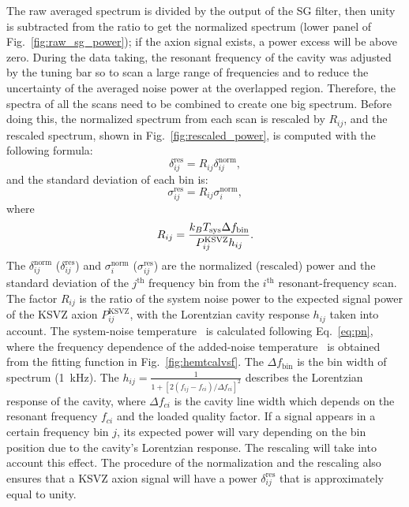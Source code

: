 The raw averaged spectrum is divided by the output of the SG filter, then  
unity is subtracted from the ratio to get the normalized spectrum 
 (lower panel of Fig.~\ref{fig:raw_sg_power}); 
if the axion signal exists, a power excess will be above zero.
During the data taking, the resonant frequency of the cavity was  
adjusted by the tuning bar so to scan a large range of frequencies and to 
reduce the uncertainty of the averaged noise power at the overlapped region. 
Therefore, the 
spectra of all the scans need to be combined to create one big spectrum. 
Before doing this, 
the normalized spectrum from each scan is rescaled by $R_{ij}$, 
and the rescaled spectrum, shown in 
Fig.~\ref{fig:rescaled_power}, is computed with the following formula:
\begin{equation}
  \label{eq:respower_eqn}
  \delta_{ij}^\text{res} = R_{ij}\delta_{ij}^\text{norm},
\end{equation}
and the standard deviation of each bin is:
\begin{equation}
  \label{eq:ressigma_eqn}
  \sigma_{ij}^\text{res} = R_{ij}\sigma_{i}^\text{norm},
\end{equation}
where 
 \begin{equation}
 R_{ij} = \frac{k_{B}T_\text{sys} \Delta f_\text{bin} }{P_{ij}^\text{KSVZ} h_{ij}}.
 \label{eq:Rratio}
 \end{equation}
The $\delta_{ij}^\text{norm}$ ($\delta_{ij}^\text{res}$) and 
$\sigma_{i}^\text{norm}$ ($\sigma_{ij}^\text{res}$) are the 
normalized (rescaled) power and the 
standard deviation of the $j^\text{th}$ frequency bin from the 
$i^\text{th}$ resonant-frequency scan. 
The factor $R_{ij}$ is the ratio of 
the system noise power to the expected signal power of the KSVZ axion 
$P_{ij}^\text{KSVZ}$, with the Lorentzian cavity response $h_{ij}$ 
taken into account. 
The system-noise temperature \tsys\ is calculated following Eq.~\eqref{eq:pn},
 where the frequency dependence of the added-noise temperature \ta\ is 
obtained from the fitting function in Fig.~\ref{fig:hemtcalvsf}. 
The $\Delta f_\text{bin}$ is the bin width of spectrum (1~kHz). 
The $h_{ij} = \frac{1}{1 + [2(f_{ij} - f_{ci})/\Delta f_{ci}]^2}$ 
describes the Lorentzian response of the cavity, where 
$\Delta f_{ci}$ is the cavity line width which depends on the resonant 
frequency $f_{ci}$ and the loaded quality factor. 
%
If a signal appears in a certain frequency bin $j$, its expected power 
will vary depending on the bin position due to the cavity's 
Lorentzian response. The rescaling will take into account this effect. 
The procedure of the normalization and the rescaling also ensures that a 
KSVZ axion signal will have a power $\delta_{ij}^\text{res}$ 
that is approximately equal to unity. 

